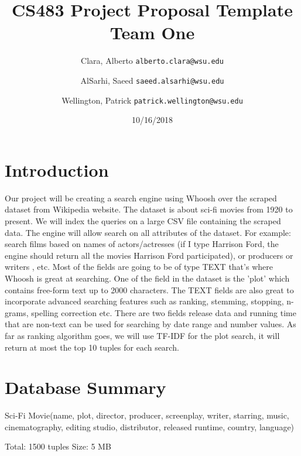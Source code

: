 \documentclass[11pt]{article}
\title{CS483 Project Proposal Template\\
\large Team One}
\author{
  Clara, Alberto      \texttt{alberto.clara@wsu.edu}
  \and
  AlSarhi, Saeed      \texttt{saeed.alsarhi@wsu.edu}
  \and
  Wellington, Patrick      \texttt{patrick.wellington@wsu.edu}
}
\date{10/16/2018}
\begin{document}
\maketitle

\section{Introduction}
Our project will be creating a search engine  using Whoosh over the scraped dataset from Wikipedia website. The dataset is about sci-fi movies from 1920 to present. We will index the queries on a large CSV file containing the scraped data. The engine will allow search on all attributes of the dataset. For example: search films based on names of actors/actresses (if I type Harrison Ford, the engine should return all the movies Harrison Ford participated), or producers or writers , etc.  Most of the fields are going to be of type TEXT that's where Whoosh is great at searching. One of the field in the dataset is the 'plot' which contains free-form text up to 2000 characters. The TEXT fields are also great to incorporate advanced searching features such as ranking, stemming, stopping, n-grams, spelling correction etc.  There are two fields release data and running time that are non-text can be used for searching by date range and number values. As far as ranking algorithm goes, we will use TF-IDF for the plot search, it will return at most the top 10 tuples for each search.

\section{Database Summary}
Sci-Fi Movie(name, plot, director, producer, screenplay, writer, starring, music, cinematography, editing studio, distributor, released runtime, country, language)
 
Total: 1500 tuples
Size: 5 MB
\end{document}
